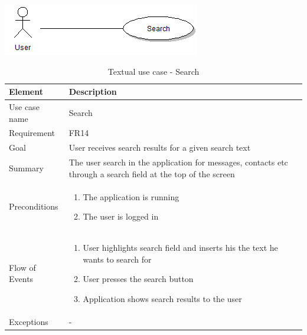 \begin{table}
\begin{center}
\begin{center}
\includegraphics[width=\textwidth]{search}
\end{center}
\begin{tabular}{p{3cm}|p{12cm}} \hline
\textbf{Element} & \textbf{Description} \\ \hline \hline
Use case name & Search \\
Requirement & FR14 \\
Goal & User receives search results for a given search text \\ \hline
Summary & The user search in the application for messages, contacts etc through a search field at the top of the screen \\ \hline
Preconditions &
\begin{enumerate}
\item{}The application is running
\item{}The user is logged in
\end{enumerate} \\ \hline
Flow of Events &
\begin{enumerate}
\item{}User highlights search field and inserts his the text he wants to search for
\item{}User presses the search button
\item{}Application shows search results to the user
\end{enumerate}\\ \hline
Exceptions & - \\ \hline
\end{tabular}
\end{center}
\caption{Textual use case - Search} \label{tab:search}
\end{table}

